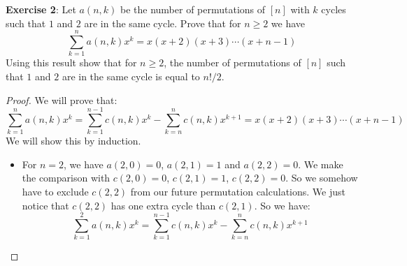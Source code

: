 \documentclass{article}
\begin{document}
\textbf{Exercise 2}: Let $a(n, k)$ be the number of permutations of $[n]$ with $k$ cycles such that $1$ and $2$ are in the same cycle. Prove that for $n \geq 2$ we have
    \begin{equation*}
        \sum_{k = 1}^{n} a(n, k)x^{k} = x(x + 2)(x + 3)\cdots (x + n - 1)
    \end{equation*}
Using this result show that for $n \geq 2$, the number of permutations of $[n]$ such that $1$ and $2$ are in the same cycle is equal to $n!/2$.
        \begin{proof}
            We will prove that:
                \begin{equation*}
                    \sum_{k = 1}^{n}a(n, k)x^{k} = \sum_{k = 1}^{n - 1}c(n, k)x^{k} - \sum_{k = n}^{n}c(n, k)x^{k + 1} = x(x + 2)(x + 3) \cdots (x + n - 1)
                \end{equation*}
            We will show this by induction.
                \begin{itemize}
                    \item For $n = 2$, we have $a(2, 0) = 0$, $a(2, 1) = 1$ and $a(2, 2) = 0$. We make the comparison with $c(2, 0) = 0$, $c(2, 1) = 1$, $c(2, 2) = 0$. So we somehow have to exclude $c(2, 2)$ from our future permutation calculations. We just notice that $c(2, 2)$ has one extra cycle than $c(2, 1)$. So we have:
                        \begin{equation*}
                            \sum_{k = 1}^{2}a(n, k)x^{k} = \sum_{k = 1}^{n - 1}c(n, k)x^{k} - \sum_{k = n}^{n} c(n, k)x^{k + 1}
                        \end{equation*}


\end{itemize}
\end{proof}
\end{document}
